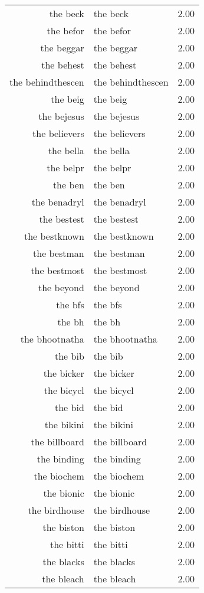 \begin{table}[ht]
\begin{tabular}{rlr}
  the beck & the beck & 2.00 \\ 
  the befor & the befor & 2.00 \\ 
  the beggar & the beggar & 2.00 \\ 
  the behest & the behest & 2.00 \\ 
  the behindthescen & the behindthescen & 2.00 \\ 
  the beig & the beig & 2.00 \\ 
  the bejesus & the bejesus & 2.00 \\ 
  the believers & the believers & 2.00 \\ 
  the bella & the bella & 2.00 \\ 
  the belpr & the belpr & 2.00 \\ 
  the ben & the ben & 2.00 \\ 
  the benadryl & the benadryl & 2.00 \\ 
  the bestest & the bestest & 2.00 \\ 
  the bestknown & the bestknown & 2.00 \\ 
  the bestman & the bestman & 2.00 \\ 
  the bestmost & the bestmost & 2.00 \\ 
  the beyond & the beyond & 2.00 \\ 
  the bfs & the bfs & 2.00 \\ 
  the bh & the bh & 2.00 \\ 
  the bhootnatha & the bhootnatha & 2.00 \\ 
  the bib & the bib & 2.00 \\ 
  the bicker & the bicker & 2.00 \\ 
  the bicycl & the bicycl & 2.00 \\ 
  the bid & the bid & 2.00 \\ 
  the bikini & the bikini & 2.00 \\ 
  the billboard & the billboard & 2.00 \\ 
  the binding & the binding & 2.00 \\ 
  the biochem & the biochem & 2.00 \\ 
  the bionic & the bionic & 2.00 \\ 
  the birdhouse & the birdhouse & 2.00 \\ 
  the biston & the biston & 2.00 \\ 
  the bitti & the bitti & 2.00 \\ 
  the blacks & the blacks & 2.00 \\ 
  the bleach & the bleach & 2.00 \\ 

\end{tabular}
\end{table}

